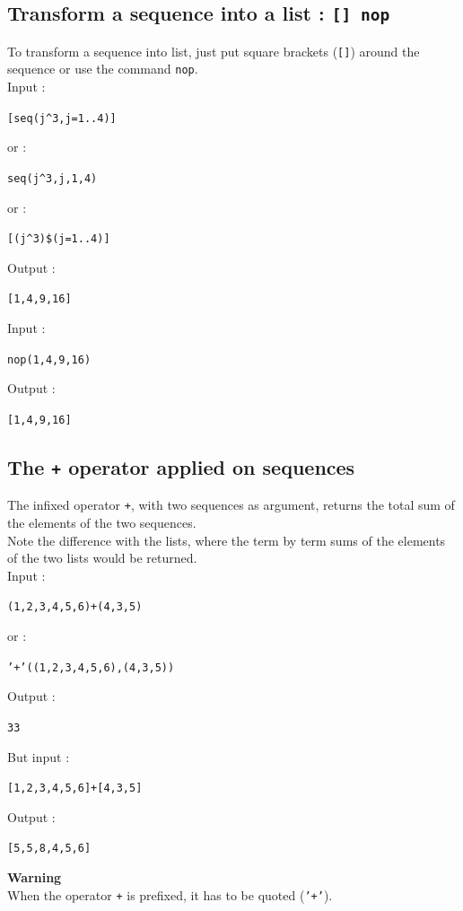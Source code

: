 \documentclass[a4paper,11pt]{book}
\begin{document}
\subsection{Transform a sequence into a list : {\tt [] nop}}\index{[]}
To transform a sequence into list, just put square brackets ({\tt []}) around
the sequence or use the command {\tt nop}.\\
Input :
\begin{center}{\tt [seq(j\verb|^|3,j=1..4)]}\end{center}
or :
\begin{center}{\tt seq(j\verb|^|3,j,1,4)}\end{center}
or :
\begin{center}{\tt [(j\verb|^|3)\$(j=1..4)]}\end{center} 
Output :
\begin{center}{\tt [1,4,9,16]}\end{center}
Input :
\begin{center}{\tt nop(1,4,9,16)}\end{center}
Output :
\begin{center}{\tt [1,4,9,16]}\end{center}

\subsection{The {\tt +} operator applied on sequences}\index{+}
The infixed operator {\tt +}, with two sequences as argument,
returns the total sum of the elements of the two sequences.\\
Note the difference with the lists, where 
the term by term sums of the elements of the two lists would
be returned.\\
Input :
\begin{center}{\tt (1,2,3,4,5,6)+(4,3,5)}\end{center}
or :
\begin{center}{\tt '+'((1,2,3,4,5,6),(4,3,5))}\end{center}
Output :
\begin{center}{\tt 33}\end{center}
But input :
\begin{center}{\tt [1,2,3,4,5,6]+[4,3,5]}\end{center}
Output :
\begin{center}{\tt [5,5,8,4,5,6]}\end{center}
{\bf Warning}\\
When the operator {\tt +} is prefixed, it has to be quoted ({\tt '+'}).
\end{document}
